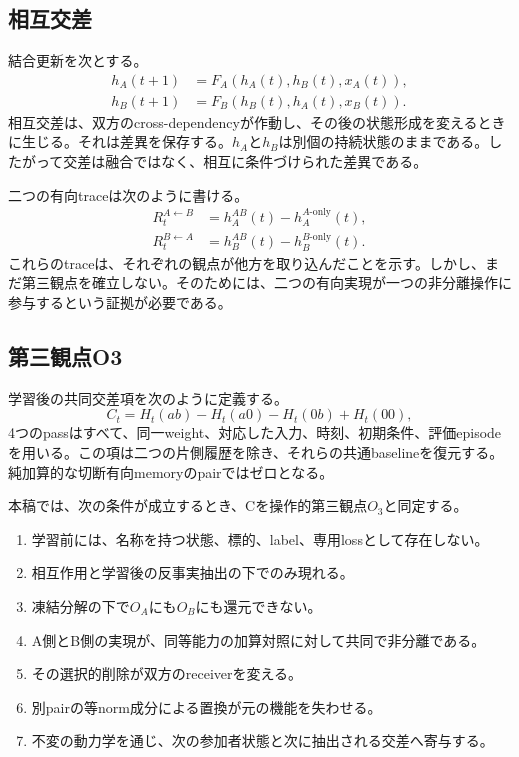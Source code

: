 \documentclass[11pt,a4paper]{article}
\newcommand{\OA}{\ensuremath{O_{A}}}
\newcommand{\OB}{\ensuremath{O_{B}}}
\newcommand{\Othree}{\ensuremath{O_{3}}}
\begin{document}
\subsection{相互交差}

結合更新を次とする。
\begin{align}
 h_A(t+1)&=F_A(h_A(t),h_B(t),x_A(t)),\\
 h_B(t+1)&=F_B(h_B(t),h_A(t),x_B(t)).
 \label{eq:coupled}
\end{align}
相互交差は、双方のcross-dependencyが作動し、その後の状態形成を変えるときに生じる。それは差異を保存する。$h_A$と$h_B$は別個の持続状態のままである。したがって交差は融合ではなく、相互に条件づけられた差異である。

二つの有向traceは次のように書ける。
\begin{align}
 R_t^{A\leftarrow B}&=h_A^{AB}(t)-h_A^{A\text{-only}}(t),\\
 R_t^{B\leftarrow A}&=h_B^{AB}(t)-h_B^{B\text{-only}}(t).
 \label{eq:directed}
\end{align}
これらのtraceは、それぞれの観点が他方を取り込んだことを示す。しかし、まだ第三観点を確立しない。そのためには、二つの有向実現が一つの非分離操作に参与するという証拠が必要である。

\subsection{第三観点O3}

学習後の共同交差項を次のように定義する。
\begin{equation}
 C_t=H_t(ab)-H_t(a0)-H_t(0b)+H_t(00),
 \label{eq:joint}
\end{equation}
4つのpassはすべて、同一weight、対応した入力、時刻、初期条件、評価episodeを用いる。この項は二つの片側履歴を除き、それらの共通baselineを復元する。純加算的な切断有向memoryのpairではゼロとなる。

本稿では、次の条件が成立するとき、Cを操作的第三観点\Othree と同定する。
\begin{enumerate}
  \item 学習前には、名称を持つ状態、標的、label、専用lossとして存在しない。
  \item 相互作用と学習後の反事実抽出の下でのみ現れる。
  \item 凍結分解の下で\OA にも\OB にも還元できない。
  \item A側とB側の実現が、同等能力の加算対照に対して共同で非分離である。
  \item その選択的削除が双方のreceiverを変える。
  \item 別pairの等norm成分による置換が元の機能を失わせる。
  \item 不変の動力学を通じ、次の参加者状態と次に抽出される交差へ寄与する。
\end{enumerate}
\end{document}
